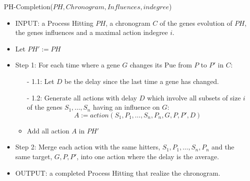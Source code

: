 \begin{algorithm}
	\caption{PH-Completion($PH,Chronogram,Influences,indegree$)}
	\label{alg:PHC_ap}
	\begin{itemize}
		\item INPUT: a Process Hitting $PH$, a chronogram $C$ of the genes evolution of $PH$, the genes influences and a maximal action indegree $i$.

		\item Let $PH' := PH$
		\item Step 1: For each time where a gene $G$ changes its Pue from $P$ to $P'$ in $C$:

		\begin{itemize}
			\item[-] 1.1: Let $D$ be the delay since the last time a gene has changed.
			\item[-] 1.2: Generate all actions with delay $D$ which involve all subsets of size $i$ of the genes $S_1, \ldots, S_n$ having an influence on $G$:
			$$A := action(S_1,P_1,\ldots, S_n,P_n, G, P, P', D)$$
			\item Add all action $A$ in $PH'$
		\end{itemize}
		
		\item Step 2: Merge each action with the same hitters, $S_1,P_1,\ldots, S_n,P_n$ and the same target, $G, P, P'$, into one action where the delay is the average.
		\item OUTPUT:  a completed Process Hitting that realize the chronogram.
	\end{itemize}
\end{algorithm}

